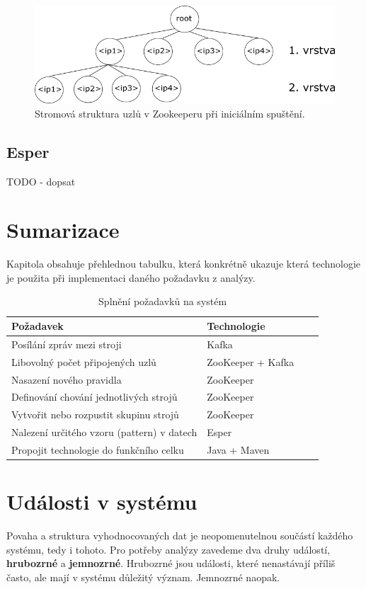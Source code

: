 \documentclass[
  digital, %
  table,   %
  nolof,     %
  nolot,     %
  twoside, %
  nocover,
  monochrome,
  12pt
]{fithesis3}
\begin{document}
\begin{figure}[H]
	\centering
    \includegraphics[width=1\textwidth, height=0.22\textheight]{images/zookeeper-impl.png}
    \caption{Stromová struktura uzlů v Zookeeperu při iniciálním spuštění.}
    \label{fig:zookeeper-impl}
\end{figure}

\newpage
\subsection{Esper}
\label{sec:esper}
TODO - dopsat

\section{Sumarizace}
Kapitola obsahuje přehlednou tabulku, která konkrétně ukazuje která technologie je použita při implementaci daného požadavku z analýzy.

\begin{table}[H]
  \centering
  \begin{tabularx}{\textwidth}{lllX}
    \toprule
    Požadavek & Technologie \\
    \midrule
    Posílání zpráv mezi stroji & Kafka \\
    Libovolný počet připojených uzlů & ZooKeeper + Kafka \\
    Nasazení nového pravidla & ZooKeeper \\
    Definování chování jednotlivých strojů & ZooKeeper \\
    Vytvořit nebo rozpustit skupinu strojů & ZooKeeper \\
    Nalezení určitého vzoru (pattern) v datech & Esper \\
    Propojit technologie do funkčního celku & Java + Maven \\
    \bottomrule
  \end{tabularx}
  \caption{Splnění požadavků na systém}
  \label{tab:fulfill-usecases}
\end{table}

\section{Události v systému}
\label{sec:udalosti-v-systemu}
Povaha a struktura vyhodnocovaných dat je neopomenutelnou součástí každého systému, tedy i tohoto. Pro potřeby analýzy zavedeme dva druhy událostí, \textbf{hrubozrné} a \textbf{jemnozrné}. Hrubozrné jsou události, které nenastávají příliš často, ale mají v systému důležitý význam. Jemnozrné naopak.
\end{document}
